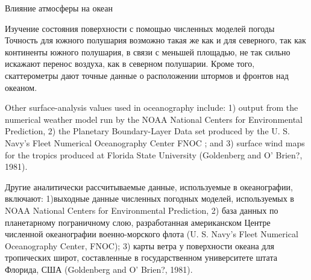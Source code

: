 \begin{chapter}{Влияние атмосферы на океан}
\begin{section}{Изучение состояния поверхности с помощью численных моделей погоды}
Точность для южного полушария возможно такая же как и для северного,
так как континенты южного полушария, в связи с меньшей площадью, не
так сильно искажают перенос воздуха, как в северном полушарии. Кроме
того, скаттерометры дают точные данные о расположении штормов и
фронтов над океаном.
%
%

Other surface-analysis values used in oceanography include: 1) output
from the numerical weather model run by the NOAA National Centers for
Environmental Prediction, 2) the Planetary Boundary-Layer Data set
produced by the U. S. Navy's Fleet Numerical Oceanography Center FNOC
; and 3) surface wind maps for the tropics produced at Florida State
University (Goldenberg and O' Brien?, 1981).

Другие аналитически рассчитываемые данные, используемые в
океанографии, включают: 1)выходные данные численных погодных моделей,
используемых в NOAA National Centers for Environmental Prediction, 2)
база данных по планетарному пограничному слою, разработанная
американском Центре численной океанографии военно-морского флота
(U. S. Navy's Fleet Numerical Oceanography Center, FNOC); 3) карты
ветра у поверхности океана для тропических широт, составленные в
государственном университете штата Флорида, США (Goldenberg and O'
Brien?, 1981).


\end{section}
\end{chapter}
